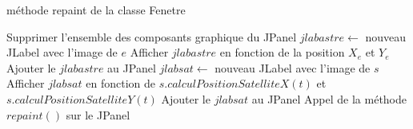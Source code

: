 \documentclass[a4paper,10pt]{article}
\begin{document}
\begin{algorithm}
\caption{méthode repaint de la classe Fenetre}
\begin{algorithmic}
\State Supprimer l'ensemble des composants graphique du JPanel
    \State $jlabastre\gets$ nouveau JLabel avec l'image de $e$
    \State Afficher $jlabastre$ en fonction de la position $X_{e}$ et $Y_{e}$
    \State Ajouter le $jlabastre$ au JPanel
	\State $jlabsat\gets$ nouveau JLabel avec l'image de $s$
	\State Afficher $jlabsat$ en fonction de $s.calculPositionSatelliteX(t)$ et $s.calculPositionSatelliteY(t)$
	\State Ajouter le $jlabsat$ au JPanel
    \EndFor
\EndFor
\State Appel de la méthode $repaint()$ sur le JPanel
\EndFunction
\end{algorithmic}
\end{algorithm}
\end{document}
